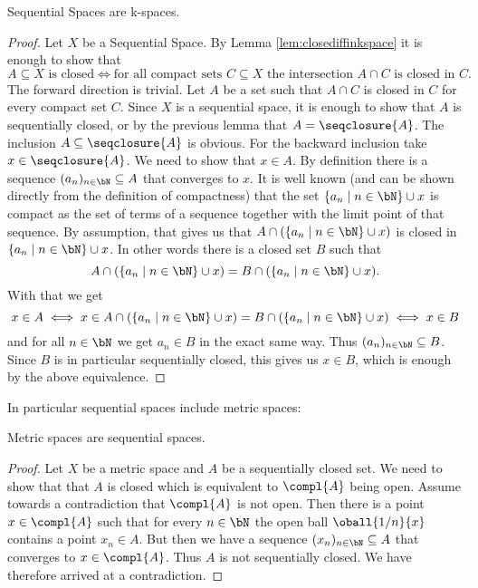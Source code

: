 \begin{lem} \label{lem:sequentialiskspace}
    Sequential Spaces are k-spaces. 
    \href{https://github.com/scholzhannah/CWComplexes/blob/7be4872a05b534011cc969eb5b80a4b7f0bf57e2/CWcomplexes/KSpace.lean#L88-L114}{\faExternalLink}
\end{lem}
\begin{proof}
    Let $X$ be a Sequential Space. 
    By Lemma \ref{lem:closediffinkspace} it is enough to show that 
    \[A \subseteq X \text{ is closed} \iff \text{for all compact sets } C \subseteq X \text{ the intersection } A \cap C \text{ is closed in } C.\]
    The forward direction is trivial.
    Let $A$ be a set such that $A \cap C$ is closed in $C$ for every compact set $C$. 
    Since $X$ is a sequential space, it is enough to show that $A$ is sequentially closed, or by the previous lemma that $A  = \seqclosure{A}$.
    The inclusion $A \subseteq \seqclosure{A}$ is obvious. 
    For the backward inclusion take $x \in \seqclosure{A}$. 
    We need to show that $x \in A$.
    By definition there is a sequence $(a_n)_{n \in \bN} \subseteq A$ that converges to $x$. 
    It is well known (and can be shown directly from the definition of compactness) that the set $\{a_n \mid n \in \bN\} \cup {x}$ is compact as the set of terms of a sequence together with the limit point of that sequence.
    \href{https://github.com/leanprover-community/mathlib4/blob/93828f4cd10fb8cab31700b110fd2751d36bf1b8/Mathlib/Topology/Compactness/Compact.lean#L620-L622}{\faExternalLink}
    By assumption, that gives us that $A \cap (\{a_n \mid n \in \bN\} \cup {x})$ is closed in $\{a_n \mid n \in \bN\} \cup {x}$. 
    In other words there is a closed set $B$ such that 
    \[A \cap (\{a_n \mid n \in \bN\} \cup {x}) = B \cap (\{a_n \mid n \in \bN\} \cup {x}).\]
    With that we get
    \[x \in A \iff x \in A \cap (\{a_n \mid n \in \bN\} \cup {x}) = B \cap (\{a_n \mid n \in \bN\} \cup {x}) \iff x \in B\]
    and for all $n \in \bN$ we get $a_n \in B$ in the exact same way. 
    Thus $(a_n)_{n \in \bN} \subseteq B$.
    Since $B$ is in particular sequentially closed, this gives us $x \in B$, which is enough by the above equivalence.
\end{proof}

In particular sequential spaces include metric spaces: 

\begin{lem}\label{lem:metricissequential}
    Metric spaces are sequential spaces.
\end{lem}
\begin{proof}
    Let $X$ be a metric space and $A$ be a sequentially closed set. 
    We need to show that that $A$ is closed which is equivalent to $\compl{A}$ being open.
    Assume towards a contradiction that $\compl{A}$ is not open. 
    Then there is a point $x \in \compl{A}$ such that for every $n \in \bN$ the open ball $\oball{1/n}{x}$ contains a point $x_n \in A$. 
    But then we have a sequence $(x_n)_{n \in \bN} \subseteq A$ that converges to $x \in \compl{A}$. Thus $A$ is not sequentially closed. 
    We have therefore arrived at a contradiction. 
\end{proof}

